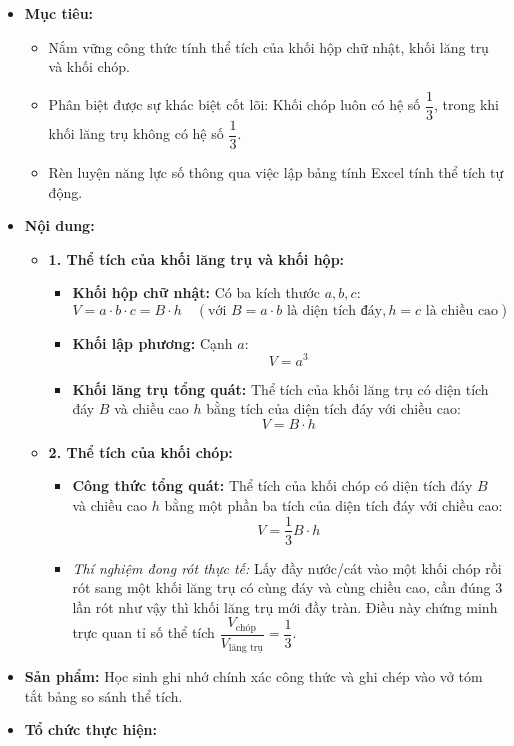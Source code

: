 \documentclass[12pt, a4paper]{article}
\begin{document}
\begin{itemize}[leftmargin=1.2cm]
    \item[a)] \textbf{Mục tiêu:}
    \begin{itemize}[leftmargin=0.6cm]
        \item Nắm vững công thức tính thể tích của khối hộp chữ nhật, khối lăng trụ và khối chóp.
        \item Phân biệt được sự khác biệt cốt lõi: Khối chóp luôn có hệ số $\dfrac{1}{3}$, trong khi khối lăng trụ không có hệ số $\dfrac{1}{3}$.
        \item Rèn luyện năng lực số thông qua việc lập bảng tính Excel tính thể tích tự động.
    \end{itemize}

    \item[b)] \textbf{Nội dung:}
    \begin{itemize}[leftmargin=0.6cm]
        \item \textbf{1. Thể tích của khối lăng trụ và khối hộp:}
        \begin{itemize}
            \item \textbf{Khối hộp chữ nhật:} Có ba kích thước $a, b, c$:
            $$V = a \cdot b \cdot c = B \cdot h \quad (\text{với } B = a \cdot b \text{ là diện tích đáy}, h = c \text{ là chiều cao})$$
            \item \textbf{Khối lập phương:} Cạnh $a$:
            $$V = a^3$$
            \item \textbf{Khối lăng trụ tổng quát:} Thể tích của khối lăng trụ có diện tích đáy $B$ và chiều cao $h$ bằng tích của diện tích đáy với chiều cao:
            $$V = B \cdot h$$
        \end{itemize}

        \item \textbf{2. Thể tích của khối chóp:}
        \begin{itemize}
            \item \textbf{Công thức tổng quát:} Thể tích của khối chóp có diện tích đáy $B$ và chiều cao $h$ bằng một phần ba tích của diện tích đáy với chiều cao:
            $$V = \dfrac{1}{3} B \cdot h$$
            \item \textit{Thí nghiệm đong rót thực tế:} Lấy đầy nước/cát vào một khối chóp rồi rót sang một khối lăng trụ có cùng đáy và cùng chiều cao, cần đúng $3$ lần rót như vậy thì khối lăng trụ mới đầy tràn. Điều này chứng minh trực quan tỉ số thể tích $\dfrac{V_{\text{chóp}}}{V_{\text{lăng trụ}}} = \dfrac{1}{3}$.
        \end{itemize}
    \end{itemize}

    \item[c)] \textbf{Sản phẩm:} Học sinh ghi nhớ chính xác công thức và ghi chép vào vở tóm tắt bảng so sánh thể tích.
    \item[d)] \textbf{Tổ chức thực hiện:}
\end{itemize}
\end{document}
